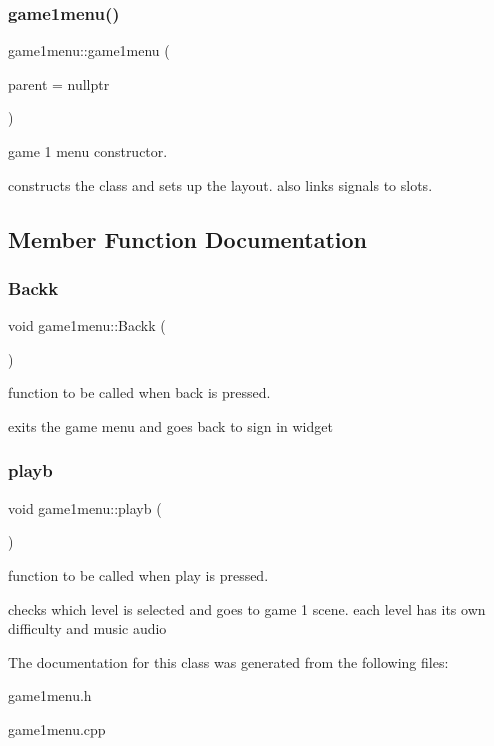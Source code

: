 \subsubsection{\texorpdfstring{game1menu()}{game1menu()}}
{\footnotesize\ttfamily game1menu\+::game1menu (\begin{DoxyParamCaption}\item[{Q\+Widget $\ast$}]{parent = {\ttfamily nullptr} }\end{DoxyParamCaption})\hspace{0.3cm}{\ttfamily [explicit]}}



game 1 menu constructor. 

constructs the class and sets up the layout. also links signals to slots. 

\subsection{Member Function Documentation}
\mbox{\label{classgame1menu_aacd43f1621af0ac39370c5f1b16868fa}} 
\subsubsection{\texorpdfstring{Backk}{Backk}}
{\footnotesize\ttfamily void game1menu\+::\+Backk (\begin{DoxyParamCaption}{ }\end{DoxyParamCaption})\hspace{0.3cm}{\ttfamily [slot]}}



function to be called when back is pressed. 

exits the game menu and goes back to sign in widget \mbox{\label{classgame1menu_a52cfac581c4ec8dee4b2790b773014c7}} 
\subsubsection{\texorpdfstring{playb}{playb}}
{\footnotesize\ttfamily void game1menu\+::playb (\begin{DoxyParamCaption}{ }\end{DoxyParamCaption})\hspace{0.3cm}{\ttfamily [slot]}}



function to be called when play is pressed. 

checks which level is selected and goes to game 1 scene. each level has it\textquotesingle{}s own difficulty and music audio 

The documentation for this class was generated from the following files\+:\begin{DoxyCompactItemize}
\item 
game1menu.\+h\item 
game1menu.\+cpp\end{DoxyCompactItemize}
